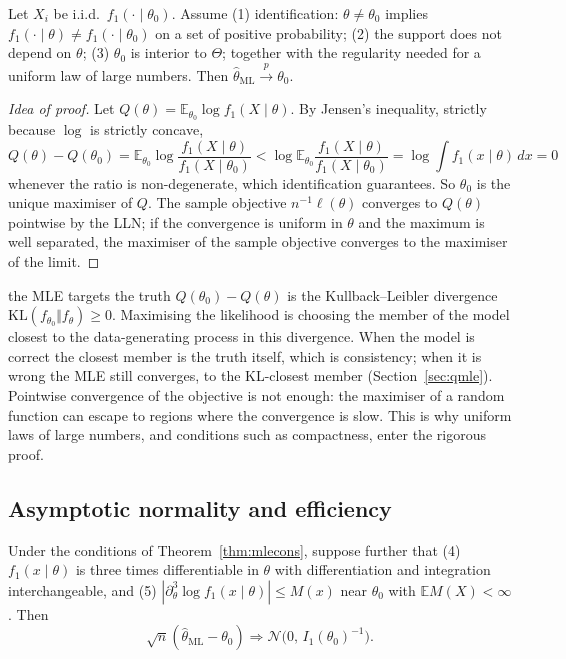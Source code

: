 \documentclass[11pt,a4paper]{article}
\newcommand{\E}{\mathbb{E}}
\newcommand{\N}{\mathcal{N}}
\newcommand{\cp}{\xrightarrow{\;p\;}}
\newcommand{\cd}{\Rightarrow}
\newcommand{\iid}{i.i.d.}
\newcommand{\thml}{\hat\theta_{\mathrm{ML}}}
\begin{document}
\begin{theorem}\label{thm:mlecons}
Let $X_i$ be \iid\ $f_1(\cdot\mid\theta_0)$. Assume \textup{(1)} identification: $\theta\neq\theta_0$ implies $f_1(\cdot\mid\theta)\neq f_1(\cdot\mid\theta_0)$ on a set of positive probability; \textup{(2)} the support does not depend on $\theta$; \textup{(3)} $\theta_0$ is interior to $\Theta$; together with the regularity needed for a uniform law of large numbers. Then $\thml\cp\theta_0$.
\end{theorem}

\begin{proof}[Idea of proof]
Let $Q(\theta)=\E_{\theta_0}\log f_1(X\mid\theta)$. By Jensen's inequality, strictly because $\log$ is strictly concave,
\[
Q(\theta)-Q(\theta_0)=\E_{\theta_0}\log\frac{f_1(X\mid\theta)}{f_1(X\mid\theta_0)}<\log\E_{\theta_0}\frac{f_1(X\mid\theta)}{f_1(X\mid\theta_0)}=\log\int f_1(x\mid\theta)\,dx=0
\]
whenever the ratio is non-degenerate, which identification guarantees. So $\theta_0$ is the unique maximiser of $Q$. The sample objective $n^{-1}\ell(\theta)$ converges to $Q(\theta)$ pointwise by the LLN; if the convergence is uniform in $\theta$ and the maximum is well separated, the maximiser of the sample objective converges to the maximiser of the limit.
\end{proof}

\begin{whybox}{the MLE targets the truth}
$Q(\theta_0)-Q(\theta)$ is the Kullback--Leibler divergence $\mathrm{KL}(f_{\theta_0}\Vert f_\theta)\ge0$. Maximising the likelihood is choosing the member of the model closest to the data-generating process in this divergence. When the model is correct the closest member is the truth itself, which is consistency; when it is wrong the MLE still converges, to the KL-closest member (Section~\ref{sec:qmle}). Pointwise convergence of the objective is not enough: the maximiser of a random function can escape to regions where the convergence is slow. This is why uniform laws of large numbers, and conditions such as compactness, enter the rigorous proof.
\end{whybox}

\subsection{Asymptotic normality and efficiency}

\begin{theorem}\label{thm:mlean}
Under the conditions of Theorem~\ref{thm:mlecons}, suppose further that \textup{(4)} $f_1(x\mid\theta)$ is three times differentiable in $\theta$ with differentiation and integration interchangeable, and \textup{(5)} $|\partial^3_\theta\log f_1(x\mid\theta)|\le M(x)$ near $\theta_0$ with $\E M(X)<\infty$. Then
\[
\sqrt n(\thml-\theta_0)\cd\N\big(0,\,I_1(\theta_0)^{-1}\big).
\]
\end{theorem}
\end{document}
